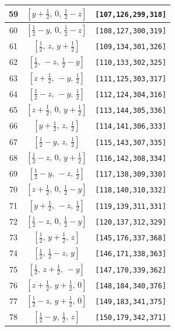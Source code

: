 \documentclass[fleqn,8pt]{jsarticle}
\begin{document}
\begin{longtable}{ccc}
59 & $\left[ y + \frac{1}{2},\, 0,\, \frac{1}{2} - z \right]$ & {\tt [107,126,299,318]} \\ \hline
60 & $\left[ \frac{1}{2} - y,\, 0,\, \frac{1}{2} - z \right]$ & {\tt [108,127,300,319]} \\ \hline
61 & $\left[ \frac{1}{2},\, z,\, y + \frac{1}{2} \right]$ & {\tt [109,134,301,326]} \\ \hline
62 & $\left[ \frac{1}{2},\, - z,\, \frac{1}{2} - y \right]$ & {\tt [110,133,302,325]} \\ \hline
63 & $\left[ z + \frac{1}{2},\, - y,\, \frac{1}{2} \right]$ & {\tt [111,125,303,317]} \\ \hline
64 & $\left[ \frac{1}{2} - z,\, - y,\, \frac{1}{2} \right]$ & {\tt [112,124,304,316]} \\ \hline
65 & $\left[ z + \frac{1}{2},\, 0,\, y + \frac{1}{2} \right]$ & {\tt [113,144,305,336]} \\ \hline
66 & $\left[ y + \frac{1}{2},\, z,\, \frac{1}{2} \right]$ & {\tt [114,141,306,333]} \\ \hline
67 & $\left[ \frac{1}{2} - y,\, z,\, \frac{1}{2} \right]$ & {\tt [115,143,307,335]} \\ \hline
68 & $\left[ \frac{1}{2} - z,\, 0,\, y + \frac{1}{2} \right]$ & {\tt [116,142,308,334]} \\ \hline
69 & $\left[ \frac{1}{2} - y,\, - z,\, \frac{1}{2} \right]$ & {\tt [117,138,309,330]} \\ \hline
70 & $\left[ z + \frac{1}{2},\, 0,\, \frac{1}{2} - y \right]$ & {\tt [118,140,310,332]} \\ \hline
71 & $\left[ y + \frac{1}{2},\, - z,\, \frac{1}{2} \right]$ & {\tt [119,139,311,331]} \\ \hline
72 & $\left[ \frac{1}{2} - z,\, 0,\, \frac{1}{2} - y \right]$ & {\tt [120,137,312,329]} \\ \hline
73 & $\left[ \frac{1}{2},\, y + \frac{1}{2},\, z \right]$ & {\tt [145,176,337,368]} \\ \hline
74 & $\left[ \frac{1}{2},\, \frac{1}{2} - z,\, y \right]$ & {\tt [146,171,338,363]} \\ \hline
75 & $\left[ \frac{1}{2},\, z + \frac{1}{2},\, - y \right]$ & {\tt [147,170,339,362]} \\ \hline
76 & $\left[ z + \frac{1}{2},\, y + \frac{1}{2},\, 0 \right]$ & {\tt [148,184,340,376]} \\ \hline
77 & $\left[ \frac{1}{2} - z,\, y + \frac{1}{2},\, 0 \right]$ & {\tt [149,183,341,375]} \\ \hline
78 & $\left[ \frac{1}{2} - y,\, \frac{1}{2},\, z \right]$ & {\tt [150,179,342,371]} \\ \hline

\end{longtable}
\end{document}
